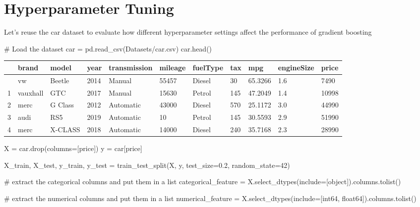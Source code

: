 \documentclass[
  letterpaper,
  DIV=11,
  numbers=noendperiod]{scrreprt}
\newenvironment{Shaded}{\begin{snugshade}}{\end{snugshade}}
\newcommand{\CommentTok}[1]{\textcolor[rgb]{0.37,0.37,0.37}{#1}}
\newcommand{\DecValTok}[1]{\textcolor[rgb]{0.68,0.00,0.00}{#1}}
\newcommand{\FloatTok}[1]{\textcolor[rgb]{0.68,0.00,0.00}{#1}}
\newcommand{\NormalTok}[1]{\textcolor[rgb]{0.00,0.23,0.31}{#1}}
\newcommand{\OperatorTok}[1]{\textcolor[rgb]{0.37,0.37,0.37}{#1}}
\newcommand{\StringTok}[1]{\textcolor[rgb]{0.13,0.47,0.30}{#1}}
\begin{document}
\section{Hyperparameter Tuning}\label{hyperparameter-tuning-2}

Let's reuse the car dataset to evaluate how different hyperparameter
settings affect the performance of gradient boosting

\begin{Shaded}
\begin{Highlighting}[]
\CommentTok{\# Load the dataset}
\NormalTok{car }\OperatorTok{=}\NormalTok{ pd.read\_csv(}\StringTok{\textquotesingle{}Datasets/car.csv\textquotesingle{}}\NormalTok{)}
\NormalTok{car.head()}
\end{Highlighting}
\end{Shaded}

\begin{longtable}[]{@{}lllllllllll@{}}
\toprule\noalign{}
& brand & model & year & transmission & mileage & fuelType & tax & mpg &
engineSize & price \\
\midrule\noalign{}
\endhead
\bottomrule\noalign{}
\endlastfoot
0 & vw & Beetle & 2014 & Manual & 55457 & Diesel & 30 & 65.3266 & 1.6 &
7490 \\
1 & vauxhall & GTC & 2017 & Manual & 15630 & Petrol & 145 & 47.2049 &
1.4 & 10998 \\
2 & merc & G Class & 2012 & Automatic & 43000 & Diesel & 570 & 25.1172 &
3.0 & 44990 \\
3 & audi & RS5 & 2019 & Automatic & 10 & Petrol & 145 & 30.5593 & 2.9 &
51990 \\
4 & merc & X-CLASS & 2018 & Automatic & 14000 & Diesel & 240 & 35.7168 &
2.3 & 28990 \\
\end{longtable}

\begin{Shaded}
\begin{Highlighting}[]
\NormalTok{X }\OperatorTok{=}\NormalTok{ car.drop(columns}\OperatorTok{=}\NormalTok{[}\StringTok{\textquotesingle{}price\textquotesingle{}}\NormalTok{])}
\NormalTok{y }\OperatorTok{=}\NormalTok{ car[}\StringTok{\textquotesingle{}price\textquotesingle{}}\NormalTok{]}

\NormalTok{X\_train, X\_test, y\_train, y\_test }\OperatorTok{=}\NormalTok{ train\_test\_split(X, y, test\_size}\OperatorTok{=}\FloatTok{0.2}\NormalTok{, random\_state}\OperatorTok{=}\DecValTok{42}\NormalTok{)}

\CommentTok{\# extract the categorical columns and put them in a list}
\NormalTok{categorical\_feature }\OperatorTok{=}\NormalTok{ X.select\_dtypes(include}\OperatorTok{=}\NormalTok{[}\StringTok{\textquotesingle{}object\textquotesingle{}}\NormalTok{]).columns.tolist()}

\CommentTok{\# extract the numerical columns and put them in a list}
\NormalTok{numerical\_feature }\OperatorTok{=}\NormalTok{ X.select\_dtypes(include}\OperatorTok{=}\NormalTok{[}\StringTok{\textquotesingle{}int64\textquotesingle{}}\NormalTok{, }\StringTok{\textquotesingle{}float64\textquotesingle{}}\NormalTok{]).columns.tolist()}
\end{Highlighting}
\end{Shaded}
\end{document}
